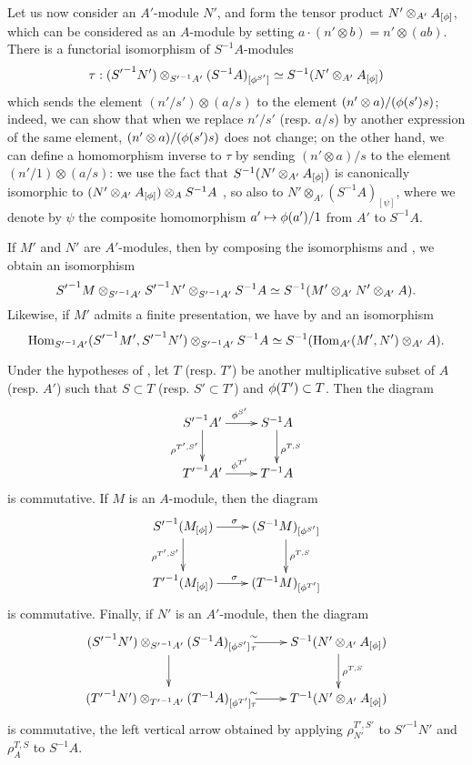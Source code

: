 \begin{env}[1.5.4]
\label{0.1.5.4}
Let us now consider an $A'$-module $N'$, and form the tensor product
$N'\otimes_{A'}A_{[\phi]}$, which can be considered as an $A$-module by setting
$a\cdot(n'\otimes b)=n'\otimes(ab)$.
There is a functorial isomorphism of $S^{-1}A$-modules
\[
  \tau:({S'}^{-1}N')\otimes_{{S'}^{-1}A'}(S^{-1}A)_{[\phi^{S'}]}\simeq S^{-1}(N'\otimes_{A'}A_{[\phi]})
\]
which
sends the element $(n'/s')\otimes(a/s)$ to the element
$(n'\otimes a)/(\phi(s')s)$; indeed, we can show that when we replace
$n'/s'$ (resp. $a/s$) by another expression of the same element,
$(n'\otimes a)/(\phi(s')s)$ does not change; on the other hand, we can define
a homomorphism inverse to $\tau$ by sending $(n'\otimes a)/s$ to the element
$(n'/1)\otimes(a/s)$: we use the fact that $S^{-1}(N'\otimes_{A'}A_{[\phi]})$
is canonically isomorphic to $(N'\otimes_{A'}A_{[\phi]})\otimes_A S^{-1}A$
, so also to $N'\otimes_{A'}(S^{-1}A)_{[\psi]}$, where we
denote by $\psi$ the composite homomorphism $a'\mapsto\vphi(a')/1$ from $A'$ to $S^{-1}A$.
\end{env}

\begin{env}[1.5.5]
\label{0.1.5.5}
If $M'$ and $N'$ are $A'$-modules, then by composing the isomorphisms  and , we obtain an isomorphism
\[
  {S'}^{-1}M\otimes_{{S'}^{-1}A'}{S'}^{-1}N'\otimes_{{S'}^{-1}A'}S^{-1}A\simeq S^{-1}(M'\otimes_{A'}N'\otimes_{A'}A).
\]
Likewise, if $M'$ admits a finite presentation, we have by  and  an isomorphism
\[
  {\mathop{\mathrm{Hom}}\nolimits}_{{S'}^{-1}A'}({S'}^{-1}M',{S'}^{-1}N')\otimes_{{S'}^{-1}A'}S^{-1}A\simeq S^{-1}({\mathop{\mathrm{Hom}}\nolimits}_{A'}(M',N')\otimes_{A'}A).
\]
\end{env}

\begin{env}[1.5.6]
\label{0.1.5.6}
Under the hypotheses of , let $T$ (resp. $T'$) be another multiplicative subset of $A$ (resp. $A'$) such that $S\subset T$ (resp. $S'\subset T'$) and $\phi(T')\subset T$.
Then the diagram
\[
  \xymatrix{
    {S'}^{-1}A'\ar[r]^{\vphi^{S'}}\ar[d]_{\rho^{T',S'}} &
    S^{-1}A\ar[d]^{\rho^{T,S}}\\
    {T'}^{-1}A'\ar[r]^{\vphi^{T'}} &
    T^{-1}A
  }
\]
is commutative.
If $M$ is an $A$-module, then the diagram
\[
  \xymatrix{
    {S'}^{-1}(M_{[\vphi]})\ar[r]^\sigma\ar[d]_{\rho^{T',S'}} &
    (S^{-1}M)_{[\vphi^{S'}]}\ar[d]^{\rho^{T,S}}\\
    {T'}^{-1}(M_{[\vphi]})\ar[r]^\sigma &
    (T^{-1}M)_{[\vphi^{T'}]}
  }
\]
is commutative.
Finally, if $N'$ is an $A'$-module, then the diagram
\[
  \xymatrix{
    ({S'}^{-1}N')\otimes_{{S'}^{-1}A'}(S^{-1}A)_{[\vphi^{S'}]}\ar[r]^\sim_\tau\ar[d] &
    S^{-1}(N'\otimes_{A'}A_{[\vphi]})\ar[d]^{\rho^{T,S}}\\
    ({T'}^{-1}N')\otimes_{{T'}^{-1}A'}(T^{-1}A)_{[\vphi^{T'}]}\ar[r]^\sim_\tau &
    T^{-1}(N'\otimes_{A'}A_{[\vphi]})
  }
\]
is commutative, the left vertical arrow obtained by applying $\rho_{N'}^{T',S'}$ to ${S'}^{-1}N'$ and $\rho_A^{T,S}$ to $S^{-1}A$.
\end{env}

